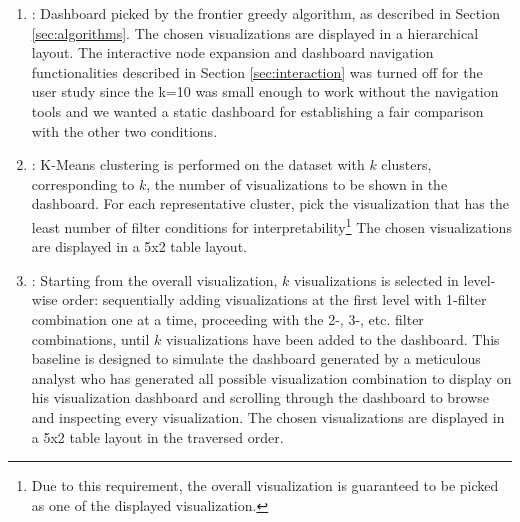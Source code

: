 \begin{enumerate}
	\item \system: Dashboard picked by the frontier greedy algorithm, as described in Section \ref{sec:algorithms}. The chosen visualizations are displayed in a hierarchical layout. The interactive node expansion and dashboard navigation functionalities described in Section \ref{sec:interaction} was turned off for the user study since the k=10 was small enough to work without the navigation tools and we wanted a static dashboard for establishing a fair comparison with the other two conditions.
	\item \cluster: K-Means clustering is performed on the dataset with $k$ clusters, corresponding to $k$, the number of visualizations to be shown in the dashboard. For each representative cluster, pick the visualization that has the least number of filter conditions for interpretability\footnote{Due to this requirement, the overall visualization is guaranteed to be picked as one of the displayed visualization.} The chosen visualizations are displayed in a 5x2 table layout.
	\item \BFS: Starting from the overall visualization, $k$ visualizations is selected in level-wise order: sequentially adding visualizations at the first level with 1-filter combination one at a time, proceeding with the 2-, 3-, etc. filter combinations, until $k$ visualizations have been added to the dashboard. This baseline is designed to simulate the dashboard generated by a meticulous analyst who has generated all possible visualization combination to display on his visualization dashboard and scrolling through the dashboard to browse and inspecting every visualization. The chosen visualizations are displayed in a 5x2 table layout in the traversed order.

\end{enumerate}
